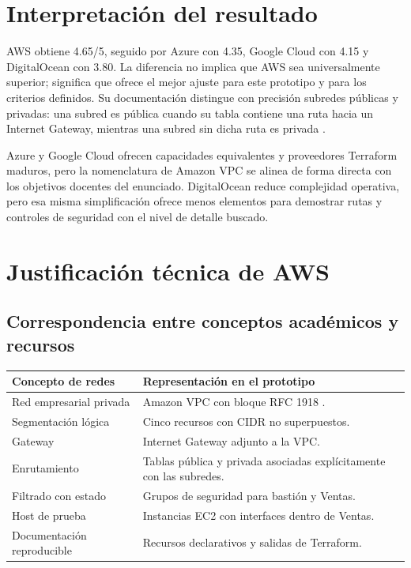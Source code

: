 \section{Interpretación del resultado}

AWS obtiene 4.65/5, seguido por Azure con 4.35, Google Cloud con 4.15 y DigitalOcean con 3.80. La diferencia no implica que AWS sea universalmente superior; significa que ofrece el mejor ajuste para este prototipo y para los criterios definidos. Su documentación distingue con precisión subredes públicas y privadas: una subred es pública cuando su tabla contiene una ruta hacia un Internet Gateway, mientras una subred sin dicha ruta es privada \cite{aws-internet-gateway}.

Azure y Google Cloud ofrecen capacidades equivalentes y proveedores Terraform maduros, pero la nomenclatura de Amazon VPC se alinea de forma directa con los objetivos docentes del enunciado. DigitalOcean reduce complejidad operativa, pero esa misma simplificación ofrece menos elementos para demostrar rutas y controles de seguridad con el nivel de detalle buscado.

\section{Justificación técnica de AWS}

\subsection{Correspondencia entre conceptos académicos y recursos}

\begin{tabularx}{\textwidth}{p{4.2cm}Y}
\toprule
\textbf{Concepto de redes} & \textbf{Representación en el prototipo} \\
\midrule
Red empresarial privada & Amazon VPC con bloque RFC 1918 . \\
Segmentación lógica & Cinco recursos  con CIDR no superpuestos. \\
Gateway & Internet Gateway adjunto a la VPC. \\
Enrutamiento & Tablas pública y privada asociadas explícitamente con las subredes. \\
Filtrado con estado & Grupos de seguridad para bastión y Ventas. \\
Host de prueba & Instancias EC2 con interfaces dentro de Ventas. \\
Documentación reproducible & Recursos declarativos y salidas de Terraform. \\
\bottomrule
\end{tabularx}

